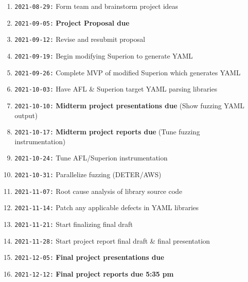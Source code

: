 \documentclass[12pt]{diazessay}
\begin{document}
\begin{enumerate}[label={}]
	\item \texttt{2021-08-29:} Form team and brainstorm project ideas
	\item \texttt{2021-09-05:} \textbf{Project Proposal due}
	\item \texttt{2021-09-12:} Revise and resubmit proposal
	\item \texttt{2021-09-19:} Begin modifying Superion to generate YAML
	\item \texttt{2021-09-26:} Complete MVP of modified Superion which generates YAML
	\item \texttt{2021-10-03:} Have AFL \& Superion target YAML parsing libraries
	\item \texttt{2021-10-10:} \textbf{Midterm project presentations due} \hfill (Show fuzzing YAML output)
	\item \texttt{2021-10-17:} \textbf{Midterm project reports due} \hfill (Tune fuzzing instrumentation)
	\item \texttt{2021-10-24:} Tune AFL/Superion instrumentation 
	\item \texttt{2021-10-31:} Parallelize fuzzing \hfill (DETER/AWS)
	\item \texttt{2021-11-07:} Root cause analysis of library source code
	\item \texttt{2021-11-14:} Patch any applicable defects in YAML libraries
	\item \texttt{2021-11-21:} Start finalizing final draft
	\item \texttt{2021-11-28:} Start project report final draft \& final presentation
	\item \texttt{2021-12-05:} \textbf{Final project presentations due}
	\item \texttt{2021-12-12:} \textbf{Final project reports due 5:35 pm}
\end{enumerate}


\clearpage


\end{document}
